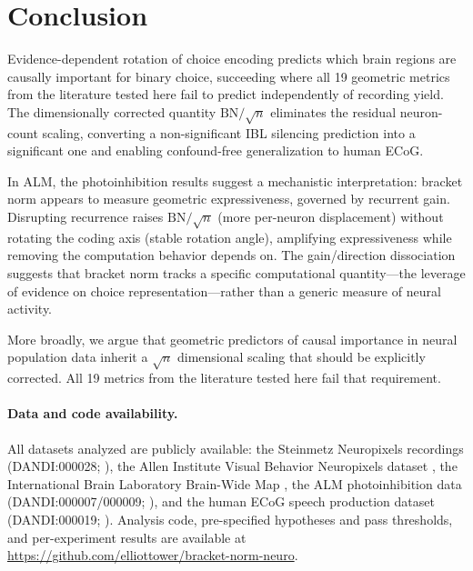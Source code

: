 \documentclass{article}
\begin{document}
\section{Conclusion}

Evidence-dependent rotation of choice encoding predicts which brain regions are causally important for binary choice, succeeding where all 19 geometric metrics from the literature tested here fail to predict independently of recording yield. The dimensionally corrected quantity $\text{BN}/\!\sqrt{n}$ eliminates the residual neuron-count scaling, converting a non-significant IBL silencing prediction into a significant one and enabling confound-free generalization to human ECoG.

In ALM, the photoinhibition results suggest a mechanistic interpretation: bracket norm appears to measure geometric expressiveness, governed by recurrent gain. Disrupting recurrence raises $\text{BN}/\!\sqrt{n}$ (more per-neuron displacement) without rotating the coding axis (stable rotation angle), amplifying expressiveness while removing the computation behavior depends on. The gain/direction dissociation suggests that bracket norm tracks a specific computational quantity---the leverage of evidence on choice representation---rather than a generic measure of neural activity.

More broadly, we argue that geometric predictors of causal importance in neural population data inherit a $\sqrt{n}$ dimensional scaling that should be explicitly corrected. All 19 metrics from the literature tested here fail that requirement.

\paragraph{Data and code availability.} All datasets analyzed are publicly available: the Steinmetz Neuropixels recordings (DANDI:000028; \citealp{steinmetz2019distributed, zatkahaas2021}), the Allen Institute Visual Behavior Neuropixels dataset \citep{siegle2021survey}, the International Brain Laboratory Brain-Wide Map \citep{ibl2025brainwide}, the ALM photoinhibition data (DANDI:000007/000009; \citealp{svoboda_alm}), and the human ECoG speech production dataset (DANDI:000019; \citealp{dandi000019}). Analysis code, pre-specified hypotheses and pass thresholds, and per-experiment results are available at \url{https://github.com/elliottower/bracket-norm-neuro}.



\end{document}
